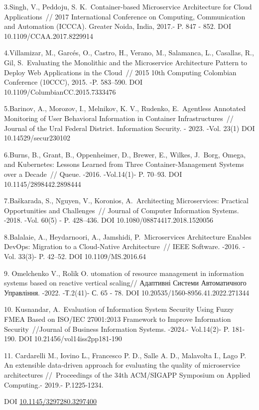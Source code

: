{3.Singh, V., Peddoju, S. K.~Container-based Microservice Architecture
for Cloud Applications~// 2017 International Conference on Computing,
Communication and Automation (ICCCA). Greater Noida, India, 2017.- P.
847 - 852. DOI 10.1109/CCAA.2017.8229914

4.Villamizar, M., Garcés, O., Castro, H., Verano, M., Salamanca, L.,
Casallas, R., Gil, S.~Evaluating the Monolithic and the Microservice
Architecture Pattern to Deploy Web Applications in the Cloud~// 2015
10th Computing Colombian Conference (10CCC), 2015. -P. 583--590. DOI
10.1109/ColumbianCC.2015.7333476

5.Barinov, A., Morozov, I., Melnikov, K. V., Rudenko, E.~Agentless
Annotated Monitoring of User Behavioral Information in Container
Infrastructures~// Journal of the Ural Federal District. Information
Security. - 2023. -Vol. 23(1) DOI 10.14529/secur230102

6.Burns, B., Grant, B., Oppenheimer, D., Brewer, E., Wilkes, J.~Borg,
Omega, and Kubernetes: Lessons Learned from Three Container-Management
Systems over a Decade~// Queue. -2016. -Vol.14(1)- P. 70--93. DOI
10.1145/2898442.2898444

7.Baškarada, S., Nguyen, V., Koronios, A.~Architecting Microservices:
Practical Opportunities and Challenges~// Journal of Computer
Information Systems. -2018. -Vol. 60(5) - P. 428--436. DOI
10.1080/08874417.2018.1520056

8.Balalaie, A., Heydarnoori, A., Jamshidi, P.~Microservices Architecture
Enables DevOps: Migration to a Cloud-Native Architecture~// IEEE
Software. -2016. -Vol. 33(3)- P. 42--52. DOI 10.1109/MS.2016.64

9. Omelchenko V., Rolik O. utomation of resource management in
information systems based on reactive vertical scaling// Адаптивні
Системи Автоматичного Управління. -2022. -Т.2(41)- С. 65 - 78. DOI
10.20535/1560-8956.41.2022.271344

10. Kusnandar, A.~Evaluation of Information System Security Using Fuzzy
FMEA Based on ISO/IEC 27001:2013 Framework to Improve Information
Security~//Journal of Business Information Systems. -2024.- Vol.14(2)-
P. 181- 190. DOI 10.21456/vol14iss2pp181-190

11. Cardarelli M., Iovino L., Francesco P. D., Salle A. D., Malavolta
I., Lago P. An extensible data-driven approach for evaluating the
quality of microservice architectures //~Proceedings of the 34th
ACM/SIGAPP Symposium on Applied Computing.- 2019.- P.1225-1234.

DOI
\href{https://doi.org/10.1145/3297280.3297400}{10.1145/3297280.3297400}

}
